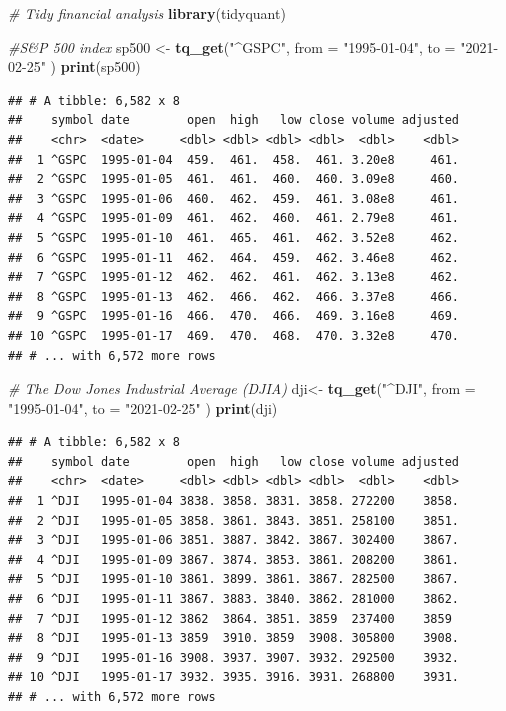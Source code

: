 \documentclass[]{book}
\newenvironment{Shaded}{\begin{snugshade}}{\end{snugshade}}
\newcommand{\CommentTok}[1]{\textcolor[rgb]{0.56,0.35,0.01}{\textit{#1}}}
\newcommand{\DataTypeTok}[1]{\textcolor[rgb]{0.13,0.29,0.53}{#1}}
\newcommand{\KeywordTok}[1]{\textcolor[rgb]{0.13,0.29,0.53}{\textbf{#1}}}
\newcommand{\NormalTok}[1]{#1}
\newcommand{\StringTok}[1]{\textcolor[rgb]{0.31,0.60,0.02}{#1}}
\begin{document}
\begin{Shaded}
\begin{Highlighting}[]
\CommentTok{# Tidy financial analysis }
\KeywordTok{library}\NormalTok{(tidyquant)}

\CommentTok{#S&P 500 index}
\NormalTok{sp500 <-}\StringTok{ }\KeywordTok{tq_get}\NormalTok{(}\StringTok{"^GSPC"}\NormalTok{, }\DataTypeTok{from =} \StringTok{"1995-01-04"}\NormalTok{, }\DataTypeTok{to =} \StringTok{"2021-02-25"}\NormalTok{ )}
\KeywordTok{print}\NormalTok{(sp500)}
\end{Highlighting}
\end{Shaded}

\begin{verbatim}
## # A tibble: 6,582 x 8
##    symbol date        open  high   low close volume adjusted
##    <chr>  <date>     <dbl> <dbl> <dbl> <dbl>  <dbl>    <dbl>
##  1 ^GSPC  1995-01-04  459.  461.  458.  461. 3.20e8     461.
##  2 ^GSPC  1995-01-05  461.  461.  460.  460. 3.09e8     460.
##  3 ^GSPC  1995-01-06  460.  462.  459.  461. 3.08e8     461.
##  4 ^GSPC  1995-01-09  461.  462.  460.  461. 2.79e8     461.
##  5 ^GSPC  1995-01-10  461.  465.  461.  462. 3.52e8     462.
##  6 ^GSPC  1995-01-11  462.  464.  459.  462. 3.46e8     462.
##  7 ^GSPC  1995-01-12  462.  462.  461.  462. 3.13e8     462.
##  8 ^GSPC  1995-01-13  462.  466.  462.  466. 3.37e8     466.
##  9 ^GSPC  1995-01-16  466.  470.  466.  469. 3.16e8     469.
## 10 ^GSPC  1995-01-17  469.  470.  468.  470. 3.32e8     470.
## # ... with 6,572 more rows
\end{verbatim}

\begin{Shaded}
\begin{Highlighting}[]
\CommentTok{# The Dow Jones Industrial Average (DJIA)}
\NormalTok{dji<-}\StringTok{ }\KeywordTok{tq_get}\NormalTok{(}\StringTok{"^DJI"}\NormalTok{, }\DataTypeTok{from =} \StringTok{"1995-01-04"}\NormalTok{, }\DataTypeTok{to =} \StringTok{"2021-02-25"}\NormalTok{ )}
\KeywordTok{print}\NormalTok{(dji)}
\end{Highlighting}
\end{Shaded}

\begin{verbatim}
## # A tibble: 6,582 x 8
##    symbol date        open  high   low close volume adjusted
##    <chr>  <date>     <dbl> <dbl> <dbl> <dbl>  <dbl>    <dbl>
##  1 ^DJI   1995-01-04 3838. 3858. 3831. 3858. 272200    3858.
##  2 ^DJI   1995-01-05 3858. 3861. 3843. 3851. 258100    3851.
##  3 ^DJI   1995-01-06 3851. 3887. 3842. 3867. 302400    3867.
##  4 ^DJI   1995-01-09 3867. 3874. 3853. 3861. 208200    3861.
##  5 ^DJI   1995-01-10 3861. 3899. 3861. 3867. 282500    3867.
##  6 ^DJI   1995-01-11 3867. 3883. 3840. 3862. 281000    3862.
##  7 ^DJI   1995-01-12 3862  3864. 3851. 3859  237400    3859 
##  8 ^DJI   1995-01-13 3859  3910. 3859  3908. 305800    3908.
##  9 ^DJI   1995-01-16 3908. 3937. 3907. 3932. 292500    3932.
## 10 ^DJI   1995-01-17 3932. 3935. 3916. 3931. 268800    3931.
## # ... with 6,572 more rows
\end{verbatim}
\end{document}
